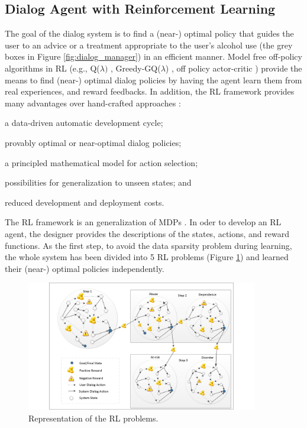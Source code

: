 \documentclass[letterpaper]{article}
\begin{document}
\subsection*{Dialog Agent with Reinforcement Learning}

The goal of the dialog system is to find a (near-) optimal policy that guides the user to an advice 
or a treatment appropriate to the user's alcohol use (the grey boxes in Figure \ref{fig:dialog_manager}) in an efficient manner. 
Model free off-policy algorithms in RL (e.g., Q($\lambda)$ \cite{sutton1998reinforcement}, 
Greedy-GQ($\lambda$) \cite{maei2010toward}, off policy actor-critic \cite{DegrisWS12}) provide the 
means to find (near-) optimal dialog policies by having the agent learn them 
from real experiences, and reward feedbacks. In addition, the RL framework provides many advantages over hand-crafted approaches \cite{lemon2007machine}: \begin{inparaenum}[1)] \item a 
data-driven automatic development cycle; \item provably optimal or near-optimal dialog policies; 
\item  a principled mathematical model for action selection; \item  possibilities for generalization 
to unseen states; and \item reduced development and deployment costs.\end{inparaenum} 

The RL framework is an generalization of MDPs \cite{sutton1998reinforcement}. In oder to develop an RL 
agent, the designer provides the descriptions of the states, actions, and reward functions. As the 
first step, to avoid the data sparsity problem during learning, the whole system has been 
divided into 5 RL problems (Figure \ref{fig:5mdpv2}) and learned their 
(near-) optimal policies independently. 

\begin{figure}[!t]
  \centering    
	\includegraphics[width=0.9\textwidth]{figures/5MDPV2}
	\caption{Representation of the RL problems.}
  \label{fig:5mdpv2}
\end{figure}
\end{document}
